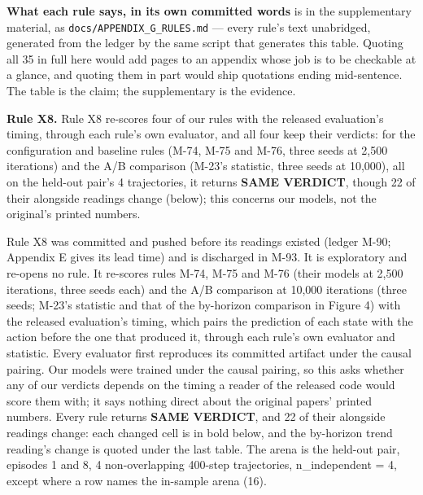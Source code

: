 \documentclass[10pt]{article}
\begin{document}
\textbf{What each rule says, in its own committed words} is in the supplementary material, as \texttt{docs/\allowbreak{}APPENDIX\_\allowbreak{}G\_\allowbreak{}RULES\allowbreak{}.md} --- every rule's text unabridged, generated from the ledger by the same script that generates this table. Quoting all 35 in full here would add pages to an appendix whose job is to be checkable at a glance, and quoting them in part would ship quotations ending mid-sentence. The table is the claim; the supplementary is the evidence.


\textbf{Rule X8.} Rule X8 re-scores four of our rules with the released evaluation's timing, through each rule's own evaluator, and all four keep their verdicts: for the configuration and baseline rules (M-74, M-75 and M-76, three seeds at 2,500 iterations) and the A/B comparison (M-23's statistic, three seeds at 10,000), all on the held-out pair's 4 trajectories, it returns \textbf{SAME VERDICT}, though 22 of their alongside readings change (below); this concerns our models, not the original's printed numbers.

Rule X8 was committed and pushed before its readings existed (ledger M-90; Appendix E gives its lead time) and is discharged in M-93. It is exploratory and re-opens no rule. It re-scores rules M-74, M-75 and M-76 (their models at 2,500 iterations, three seeds each) and the A/B comparison at 10,000 iterations (three seeds; M-23's statistic and that of the by-horizon comparison in Figure 4) with the released evaluation's timing, which pairs the prediction of each state with the action before the one that produced it, through each rule's own evaluator and statistic. Every evaluator first reproduces its committed artifact under the causal pairing. Our models were trained under the causal pairing, so this asks whether any of our verdicts depends on the timing a reader of the released code would score them with; it says nothing direct about the original papers' printed numbers. Every rule returns \textbf{SAME VERDICT}, and 22 of their alongside readings change: each changed cell is in bold below, and the by-horizon trend reading's change is quoted under the last table. The arena is the held-out pair, episodes 1 and 8, 4 non-overlapping 400-step trajectories, n\_independent = 4, except where a row names the in-sample arena (16).
\end{document}
